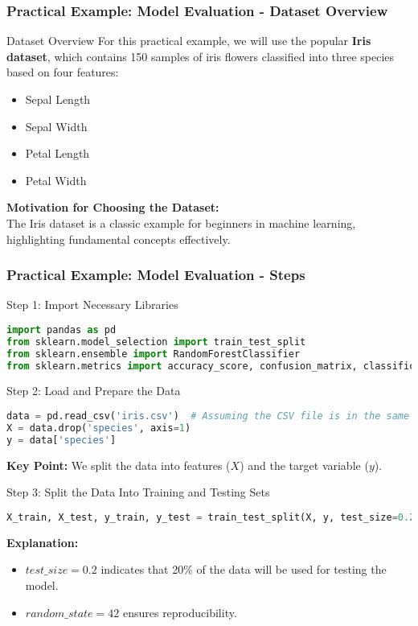 \documentclass[aspectratio=169]{beamer}
\begin{document}
\begin{frame}[fragile]
    \frametitle{Practical Example: Model Evaluation - Dataset Overview}
    \begin{block}{Dataset Overview}
        For this practical example, we will use the popular \textbf{Iris dataset}, 
        which contains 150 samples of iris flowers classified into three species based on four features:
    \end{block}
    \begin{itemize}
        \item Sepal Length
        \item Sepal Width
        \item Petal Length
        \item Petal Width
    \end{itemize}
    \textbf{Motivation for Choosing the Dataset:} \\
    The Iris dataset is a classic example for beginners in machine learning, highlighting fundamental concepts effectively.
\end{frame}

\begin{frame}[fragile]
    \frametitle{Practical Example: Model Evaluation - Steps}
    \begin{block}{Step 1: Import Necessary Libraries}
        \begin{lstlisting}[language=Python]
import pandas as pd
from sklearn.model_selection import train_test_split
from sklearn.ensemble import RandomForestClassifier
from sklearn.metrics import accuracy_score, confusion_matrix, classification_report
        \end{lstlisting}
    \end{block}

    \begin{block}{Step 2: Load and Prepare the Data}
        \begin{lstlisting}[language=Python]
data = pd.read_csv('iris.csv')  # Assuming the CSV file is in the same directory
X = data.drop('species', axis=1)
y = data['species']
        \end{lstlisting}
        \textbf{Key Point:} We split the data into features (\(X\)) and the target variable (\(y\)).
    \end{block}

    \begin{block}{Step 3: Split the Data Into Training and Testing Sets}
        \begin{lstlisting}[language=Python]
X_train, X_test, y_train, y_test = train_test_split(X, y, test_size=0.2, random_state=42)
        \end{lstlisting}
        \textbf{Explanation:}
        \begin{itemize}
            \item \(test\_size=0.2\) indicates that 20\% of the data will be used for testing the model.
            \item \(random\_state=42\) ensures reproducibility.
        \end{itemize}
    \end{block}
\end{frame}
\end{document}

